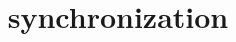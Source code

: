 \graphicspath{{./figures/}}
\title{synchronization}
\date{}

\begin{frame}
    \titlepage
\end{frame}






